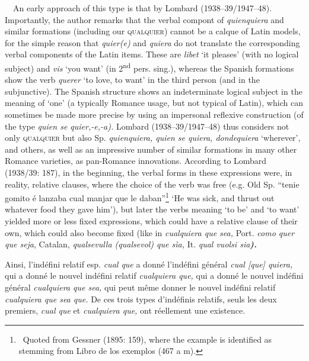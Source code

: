 \begin{styleStandard}
\ \ An early approach of this type is that by Lombard (1938–39/1947–48). Importantly, the author remarks that the verbal compont of \textit{quienquiera} and similar formations (including our \textsc{qualquier}) cannot be a calque of Latin models, for the simple reason that \textit{quier(e)} and \textit{quiera }do not translate the corresponding verbal components of the Latin items. These are \textit{libet }‘it pleases’ (with no logical subject) and \textit{vis} ‘you want’ (in 2\textsuperscript{nd} pers. sing.), whereas the Spanish formations show the verb \textit{querer} ‘to love, to want’ in the third person (and in the subjunctive). The Spanish structure shows an indeterminate logical subject in the meaning of ‘one’ (a typically Romance usage, but not typical of Latin), which can sometimes be made more precise by using an impersonal reflexive construction (of the type \textit{quien se quier,\nobreakdash-e,\nobreakdash-a). }Lombard (1938–39/1947–48) thus considers not only \textsc{qualquier}\textit{ }but also Sp. \textit{quienquiera, quien se quiera, dondequiera} ‘wherever’,\textit{ }and others, as well as an impressive number of similar formations in many other Romance varieties, as pan-Romance innovations. According to Lombard (1938/39: 187), in the beginning, the verbal forms in these expressions were, in reality, relative clauses, where the choice of the verb was free (e.g. Old Sp. “tenie gomito é lanzaba cual manjar que le daban”\footnote{\ Quoted from Gessner (1895: 159), where the example is identified as stemming from Libro de los exemplos (467 a m).} ‘He was sick, and thrust out whatever food they gave him’), but later the verbs meaning ‘to be’ and ‘to want’ yielded more or less fixed expressions, which could have a relative clause of their own, which could also become fixed (like in \textit{cualquiera que sea, }Port. \textit{como quer que seja}, Catalan, \textit{qualsevulla (qualsevol) que sìa, }It. \textit{qual vuolsi sia}\textbf{\textit{).}}
\end{styleStandard}

\begin{styleStandard}
Ainsi, l’indéfini relatif esp. \textit{cual que }a donné l’indéfini général \textit{cual [que] quiera, }qui a donné le nouvel indéfini relatif \textit{cualquiera que, }qui a donné le nouvel indéfini général \textit{cualquiera que sea, }qui peut même donner le nouvel indéfini relatif \textit{cualquiera que sea que. }De ces trois types d’indéfinis relatifs, seuls les deux premiers, \textit{cual que }et \textit{cualquiera que, }ont réellement une existence.
\end{styleStandard}

